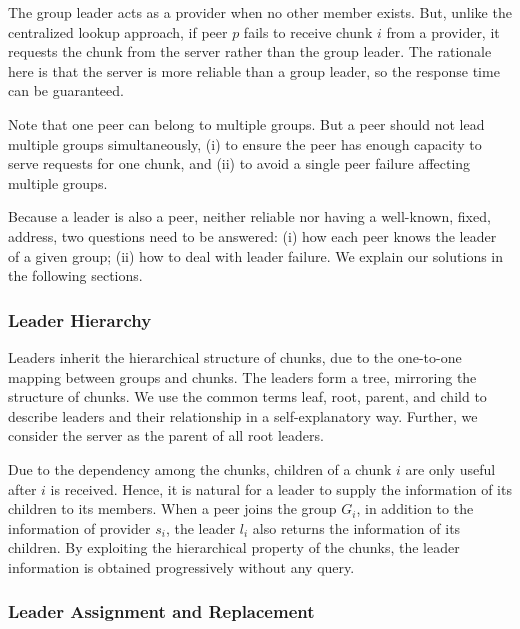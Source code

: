     The group leader acts as a provider when no other member
    exists.  But, unlike the centralized lookup approach, %
    if peer $p$ fails to receive chunk $i$ from a provider, it requests
    the chunk from the server rather than the group leader.  The
    rationale here is that the server is more reliable than
    a group leader, so the response time can be guaranteed.

    Note that one peer can belong to multiple groups.  But a
    peer should not lead multiple groups
    simultaneously, (i) to ensure the peer has enough
    capacity to serve requests for one chunk, and (ii) to
    avoid a single peer failure affecting multiple
    groups.

    Because a leader is also a peer, neither reliable nor
    having a well-known, fixed, address, two questions need
    to be answered: (i) how each peer knows the leader of a
    given group; (ii) how to deal with leader failure.
    We explain our solutions in the following sections.

    \subsubsection{Leader Hierarchy}

    Leaders inherit the hierarchical structure of
    chunks, due to the one-to-one mapping
    between groups and chunks.  The leaders form a tree, 
    mirroring the structure of chunks.  We use the common terms 
    leaf, root, parent, and child to describe leaders and their 
    relationship in a self-explanatory way.  Further, 
    we consider the server as the parent of all root leaders.
    
    Due to the dependency among the chunks, children of a
    chunk $i$ are only useful after $i$ is received.  Hence,
    it is natural for a leader to supply the information of
    its children to its members.  When a peer joins the
    group $G_i$, in addition to the information of provider
    $s_i$, the leader $l_i$ also returns the information of its children.
    By exploiting the hierarchical property of the chunks, the 
    leader information is obtained progressively without any query.

\subsubsection{Leader Assignment and Replacement}


